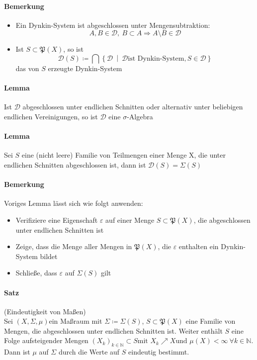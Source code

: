 \documentclass[12pt,a4paper,fleqn]{article}
\def\set#1{{\left\{ #1 \right\}}}
\def\Mid{\ \middle|\ }
\begin{document}
\paragraph{Bemerkung}
\begin{itemize}
\item Ein Dynkin-System ist abgeschlossen unter Mengensubtraktion:
\begin{displaymath}
A, B \in \mathcal{D},\ B \subset A \Rightarrow A \setminus B \in \mathcal{D}
\end{displaymath}
\item Ist $S \subset \mathfrak{P}(X)$, so ist
\begin{displaymath}
\mathcal{D}(S) \coloneqq \bigcap \set{\mathcal{D}\Mid \mathcal{D}  \text{ist Dynkin-System}, S \in \mathcal{D}}
\end{displaymath}
das von $S$ erzeugte Dynkin-System
\end{itemize}

\paragraph{Lemma} Ist $\mathcal{D}$ abgeschlossen unter endlichen Schnitten oder alternativ unter beliebigen endlichen Vereinigungen, so ist $\mathcal{D}$ eine $\sigma$-Algebra

\paragraph{Lemma} Sei $S$ eine (nicht leere) Familie von Teilmengen einer Menge X, die unter endlichen Schnitten abgeschlossen ist, dann ist $\mathcal{D}(S) = \Sigma(S)$

\paragraph{Bemerkung} Voriges Lemma lässt sich wie folgt anwenden:
\begin{itemize}
\item Verifiziere eine Eigenschaft $\varepsilon$ auf einer Menge $S \subset \mathfrak{P}(X)$, die abgeschlossen unter endlichen Schnitten ist
\item Zeige, dass die Menge aller Mengen in $\mathfrak{P}(X)$, die $\varepsilon$ enthalten ein Dynkin-System bildet
\item Schließe, dass $\varepsilon$ auf $\Sigma(S)$ gilt
\end{itemize} 

\paragraph{Satz}(Eindeutigkeit von Maßen)\\
Sei $(X, \Sigma, \mu)$ein Maßraum mit $\Sigma \coloneqq \Sigma(S)$, $S \subset \mathfrak{P}(X)$ eine Familie von Mengen, die abgeschlossen unter endlichen Schnitten ist. Weiter enthält $S$ eine Folge aufsteigender Mengen $(X_k)_{k \in \mathbb{N}} \subset S \text{mit } X_k \nearrow X \text{und } \mu(X) < \infty \ \forall k \in \mathbb{N}$. Dann ist $\mu$ auf $\Sigma$ durch die Werte auf $S$ eindeutig bestimmt.
\end{document}
